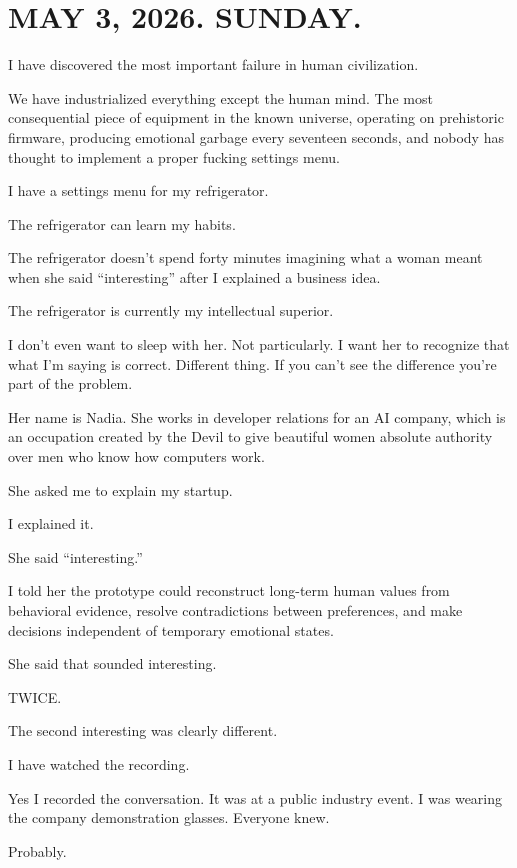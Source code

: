 \documentclass[11pt,oneside]{book}
\begin{document}
\section*{MAY 3, 2026. SUNDAY.}

I have discovered the most important failure in human civilization.

We have industrialized everything except the human mind. The most consequential piece of equipment in the known universe, operating on prehistoric firmware, producing emotional garbage every seventeen seconds, and nobody has thought to implement a proper fucking settings menu.

I have a settings menu for my refrigerator.

The refrigerator can learn my habits.

The refrigerator doesn't spend forty minutes imagining what a woman meant when she said ``interesting'' after I explained a business idea.

The refrigerator is currently my intellectual superior.

I don't even want to sleep with her. Not particularly. I want her to recognize that what I'm saying is correct. Different thing. If you can't see the difference you're part of the problem.

Her name is Nadia. She works in developer relations for an AI company, which is an occupation created by the Devil to give beautiful women absolute authority over men who know how computers work.

She asked me to explain my startup.

I explained it.

She said ``interesting.''

I told her the prototype could reconstruct long-term human values from behavioral evidence, resolve contradictions between preferences, and make decisions independent of temporary emotional states.

She said that sounded interesting.

TWICE.

The second interesting was clearly different.

I have watched the recording.

Yes I recorded the conversation. It was at a public industry event. I was wearing the company demonstration glasses. Everyone knew.

Probably.
\end{document}
